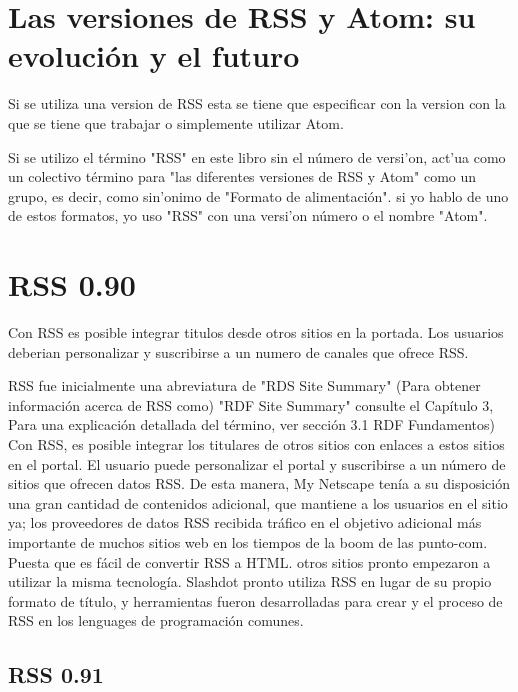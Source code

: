 \normalsize

\section{Las versiones de RSS y Atom: su evoluci\'{o}n y el futuro}
Si se utiliza una version de RSS esta se tiene que especificar con la version con la que se tiene
que trabajar o simplemente utilizar Atom.

\scriptsize

Si se utilizo el t\'{e}rmino "RSS" en este libro sin el n\'{u}mero de versi'{o}n, act'{u}a como un colectivo
t\'{e}rmino para "las diferentes versiones de RSS y Atom" como un grupo, es decir, como sin'{o}nimo de "Formato
de alimentaci\'{o}n". si yo hablo de uno de estos formatos, yo uso "RSS" con una versi'{o}n n\'{u}mero o el nombre
"Atom".

\normalsize 

\section{RSS 0.90}

Con RSS es posible integrar titulos desde otros sitios en la portada. Los usuarios deberian personalizar
y suscribirse a un numero de canales que ofrece RSS.

\scriptsize

RSS fue inicialmente una abreviatura de "RDS Site Summary" (Para obtener informaci\'{o}n acerca de RSS como)
"RDF Site Summary" consulte el Cap\'{i}tulo 3, Para una explicaci\'{o}n detallada del t\'{e}rmino, ver secci\'{o}n
3.1 RDF Fundamentos) Con RSS, es posible integrar los titulares de otros sitios con enlaces a estos sitios en el 
portal. El usuario puede personalizar el portal y suscribirse a un n\'{u}mero de sitios que ofrecen datos RSS.
De esta manera, My Netscape ten\'{i}a a su disposici\'{o}n una gran cantidad de contenidos adicional, que mantiene
a los usuarios en el sitio ya; los proveedores de datos RSS recibida tr\'{a}fico en el objetivo adicional m\'{a}s
importante de muchos sitios web en los tiempos de la boom de las punto-com. Puesta que es f\'{a}cil de convertir 
RSS a HTML. otros sitios pronto empezaron a utilizar la misma tecnolog\'{i}a. Slashdot pronto utiliza RSS en lugar
de su propio formato de t\'{i}tulo, y herramientas fueron desarrolladas para crear y el proceso de RSS en los 
lenguages de programaci\'{o}n comunes.

\normalsize

\subsection{RSS 0.91}

